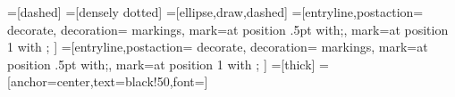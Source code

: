 =[dashed]
=[densely dotted]
=[ellipse,draw,dashed]
=[entryline,postaction={%
  decorate,%
  decoration={%
    markings,%
    mark=at position .5pt with{\arrowreversed[line width=.35pt]{|}};,
    mark=at position 1 with{%
      };%
  }%
}]
=[entryline,postaction={%
  decorate,%
  decoration={%
    markings,%
    mark=at position .5pt with{\arrowreversed[line width=.35pt]{|}};,
    mark=at position 1 with{%
      };%
  }%
}]
=[thick]
=[anchor=center,text=black!50,font=\huge]
\newlength{\spexx}
\setlength{\spexx}{1.3\tmvbtsmox}
\newlength{\spexy}
\setlength{\spexy}{.7\tmvbtsmoy}

